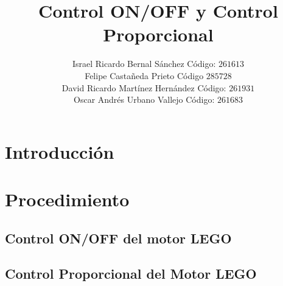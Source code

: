 \documentclass[twocolumn]{IEEEtran}
\begin{document}
\title{Control ON/OFF y Control Proporcional}
\author{Israel Ricardo Bernal Sánchez Código: $261613$\\
	Felipe Castañeda Prieto Código $285728$\\
	David Ricardo Martínez Hernández Código: $261931$\\
	Oscar Andrés Urbano Vallejo Código: $261683$}
\maketitle
{}

\begin{abstract}

\end{abstract}

\begin{keywords}
 
\end{keywords}

\section{Introducción}


\section{Procedimiento}
\subsection{Control ON/OFF del motor LEGO}
\noindent



\subsection{Control Proporcional del Motor LEGO}
\noindent
\end{document}
